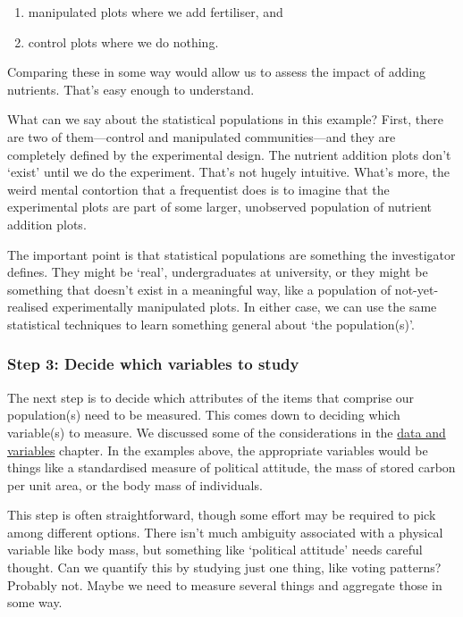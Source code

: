 \documentclass[
]{book}
\providecommand{\tightlist}{%
  \setlength{\itemsep}{0pt}\setlength{\parskip}{0pt}}
\begin{document}
\begin{enumerate}
\def\labelenumi{\arabic{enumi}.}
\tightlist
\item
  manipulated plots where we add fertiliser, and
\item
  control plots where we do nothing.
\end{enumerate}

Comparing these in some way would allow us to assess the impact of adding nutrients. That's easy enough to understand.

What can we say about the statistical populations in this example? First, there are two of them---control and manipulated communities---and they are completely defined by the experimental design. The nutrient addition plots don't `exist' until we do the experiment. That's not hugely intuitive. What's more, the weird mental contortion that a frequentist does is to imagine that the experimental plots are part of some larger, unobserved population of nutrient addition plots.

The important point is that statistical populations are something the investigator defines. They might be `real', undergraduates at university, or they might be something that doesn't exist in a meaningful way, like a population of not-yet-realised experimentally manipulated plots. In either case, we can use the same statistical techniques to learn something general about `the population(s)'.

\hypertarget{step-3-decide-which-variables-to-study}{%
\subsubsection*{Step 3: Decide which variables to study}\label{step-3-decide-which-variables-to-study}}

The next step is to decide which attributes of the items that comprise our population(s) need to be measured. This comes down to deciding which variable(s) to measure. We discussed some of the considerations in the \protect\hyperlink{data-variables}{data and variables} chapter. In the examples above, the appropriate variables would be things like a standardised measure of political attitude, the mass of stored carbon per unit area, or the body mass of individuals.

This step is often straightforward, though some effort may be required to pick among different options. There isn't much ambiguity associated with a physical variable like body mass, but something like `political attitude' needs careful thought. Can we quantify this by studying just one thing, like voting patterns? Probably not. Maybe we need to measure several things and aggregate those in some way.
\end{document}
